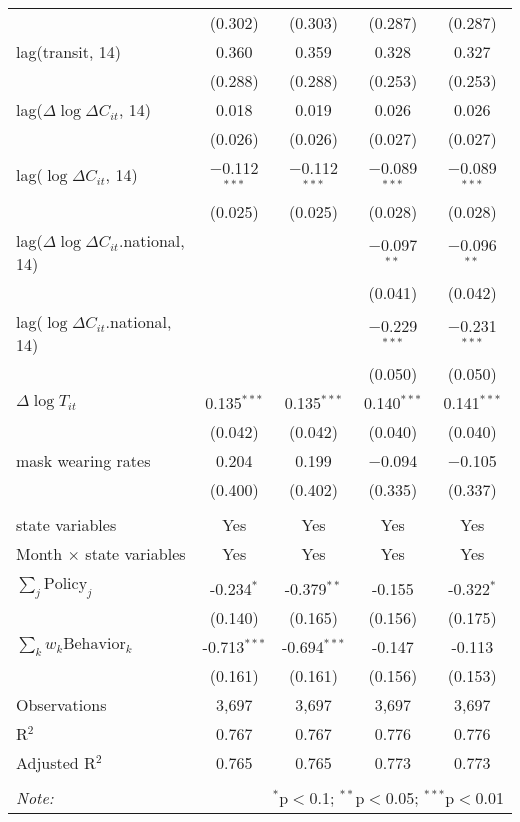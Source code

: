 \begin{tabular}{@{\extracolsep{1pt}}lcccc}
  & (0.302) & (0.303) & (0.287) & (0.287) \\ 
  lag(transit, 14) & 0.360 & 0.359 & 0.328 & 0.327 \\ 
  & (0.288) & (0.288) & (0.253) & (0.253) \\ 
  lag($\Delta \log \Delta C_{it}$, 14) & 0.018 & 0.019 & 0.026 & 0.026 \\ 
  & (0.026) & (0.026) & (0.027) & (0.027) \\ 
  lag($\log \Delta C_{it}$, 14) & $-$0.112$^{***}$ & $-$0.112$^{***}$ & $-$0.089$^{***}$ & $-$0.089$^{***}$ \\ 
  & (0.025) & (0.025) & (0.028) & (0.028) \\ 
  lag($\Delta \log \Delta C_{it}$.national, 14) &  &  & $-$0.097$^{**}$ & $-$0.096$^{**}$ \\ 
  &  &  & (0.041) & (0.042) \\ 
  lag($\log \Delta C_{it}$.national, 14) &  &  & $-$0.229$^{***}$ & $-$0.231$^{***}$ \\ 
  &  &  & (0.050) & (0.050) \\ 
  $\Delta \log T_{it}$ & 0.135$^{***}$ & 0.135$^{***}$ & 0.140$^{***}$ & 0.141$^{***}$ \\ 
  & (0.042) & (0.042) & (0.040) & (0.040) \\ 
  mask wearing rates & 0.204 & 0.199 & $-$0.094 & $-$0.105 \\ 
  & (0.400) & (0.402) & (0.335) & (0.337) \\ 
 \hline \\[-1.8ex] 
state variables & Yes & Yes & Yes & Yes \\ 
Month $\times$ state variables & Yes & Yes & Yes & Yes \\ 
\hline \\[-1.8ex] 
$\sum_j \mathrm{Policy}_j$ & -0.234$^{*}$ & -0.379$^{**}$ & -0.155 & -0.322$^{*}$ \\ 
 & (0.140) & (0.165) & (0.156) & (0.175) \\ 
$\sum_k w_k \mathrm{Behavior}_k$ & -0.713$^{***}$ & -0.694$^{***}$ & -0.147 & -0.113 \\ 
 & (0.161) & (0.161) & (0.156) & (0.153) \\ 
Observations & 3,697 & 3,697 & 3,697 & 3,697 \\ 
R$^{2}$ & 0.767 & 0.767 & 0.776 & 0.776 \\ 
Adjusted R$^{2}$ & 0.765 & 0.765 & 0.773 & 0.773 \\ 
\hline 
\hline \\[-1.8ex] 
\textit{Note:}  & \multicolumn{4}{r}{$^{*}$p$<$0.1; $^{**}$p$<$0.05; $^{***}$p$<$0.01} \\ 
\end{tabular} 